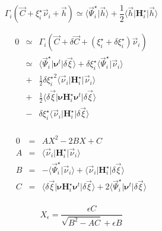 \documentclass[aps,12pt]{revtex4}
\begin{document}
\begin{equation}
	\Gamma_i\left( \vec{C} + \xi_i^\star \vec{\nu}_i + \vec{h} \right) \simeq 
	\langle \vec{\Psi}_i^\star \vert \vec{h} \rangle +
	\frac{1}{2} \langle \vec{h} \vert \bm{H}_i^\star \vert \vec{h} \rangle
\end{equation}
 
\begin{equation}
\begin{array}{rcl}
0 & \simeq & \Gamma_i\left( \vec{C} + \delta\vec{C} + (\xi_i^\star+\delta\xi_i^\star) \vec{\nu}_i \right)\\
 & \simeq & \langle \vec{\Psi}_i^\star \vert \bm{\nu}^t \vert \delta\vec{\xi} \rangle 
 + \delta\xi_i^\star \langle \vec{\Psi}_i^\star \vert \vec{\nu}_i \rangle
 \\
 & + & \frac{1}{2} {\delta\xi_i^\star}^2 \langle \vec{\nu}_i \vert \bm{H}_i^\star \vert \vec{\nu}_i \rangle\\
 & + & \frac{1}{2}  \langle \delta\vec{\xi}   \vert \bm{\nu} \bm{H}_i^\star \bm{\nu}^t \vert  \delta\vec{\xi} \rangle\\
 & - & \delta\xi_i^\star \langle \vec{\nu}_i \vert \bm{H}_i^\star \vert \delta\vec{\xi} \rangle\\
\end{array}
\end{equation} 
 
\begin{equation}
\begin{array}{rcl}
 0 & = & A X^2 - 2 B X + C\\
 A & = & \langle \vec{\nu}_i \vert \bm{H}_i^\star \vert \vec{\nu}_i \rangle\\
 B & = & -\langle \vec{\Psi}_i^\star \vert \vec{\nu}_i \rangle + \langle \vec{\nu}_i \vert \bm{H}_i^\star \vert \delta\vec{\xi} \rangle\\
 C & = & \langle \delta\vec{\xi}   \vert \bm{\nu} \bm{H}_i^\star \bm{\nu}^t \vert  \delta\vec{\xi} \rangle 
 + 2 \langle \vec{\Psi}_i^\star \vert \bm{\nu}^t \vert \delta\vec{\xi} \rangle \\
\end{array}
\end{equation}

\begin{equation}
	X_\epsilon = \dfrac{\epsilon C}{\sqrt{B^2-AC}+\epsilon B}
\end{equation}

 
\end{document}
